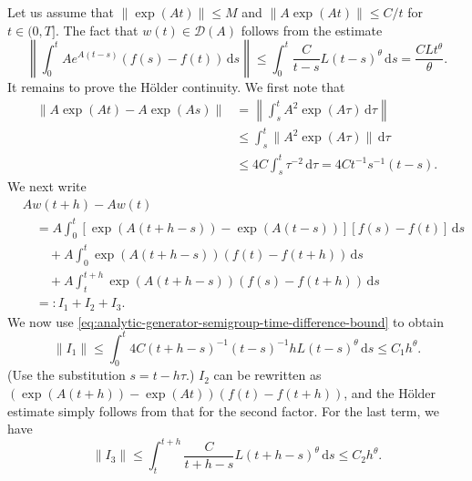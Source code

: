 \begin{Proof}
Let us assume that $\|\exp(At)\|\leq M$ and $\|A\exp(At)\|\leq C/t$ for $t\in(0,T]$. The fact that $w(t)\in\mathcal{D}(A)$ follows from the estimate
\begin{equation}\label{eq:analytic-holder-data-difference-in-generator-domain-bound}
\left\|\int_0^t Ae^{A(t-s)}(f(s)-f(t))\,\mathrm{d}s\right\|\leq\int_0^t\dfrac{C}{t-s}L(t-s)^\theta\,\mathrm{d}s=\dfrac{CLt^\theta}{\theta}.
\end{equation}
It remains to prove the Hölder continuity. We first note that
\begin{equation}\label{eq:analytic-generator-semigroup-time-difference-bound}
\begin{aligned}\|A\exp(At)-A\exp(As)\|&=\left\|\int_s^t A^2\exp(A\tau)\,\mathrm{d}\tau\right\|\\&\leq\int_s^t\|A^2\exp(A\tau)\|\,\mathrm{d}\tau\\&\leq4C\int_s^t\tau^{-2}\,\mathrm{d}\tau=4Ct^{-1}s^{-1}(t-s).\end{aligned}
\end{equation}
We next write\[\begin{aligned}
&Aw(t+h)-Aw(t)\\
&\quad=A\int_0^t[\exp(A(t+h-s))-\exp(A(t-s))][f(s)-f(t)]\,\mathrm{d}s\\
&\qquad+A\int_0^t\exp(A(t+h-s))(f(t)-f(t+h))\,\mathrm{d}s\\
&\qquad+A\int_t^{t+h}\exp(A(t+h-s))(f(s)-f(t+h))\,\mathrm{d}s\\
&\quad=:I_1+I_2+I_3.
\end{aligned}\]We now use \eqref{eq:analytic-generator-semigroup-time-difference-bound} to obtain
\begin{equation}\label{eq:analytic-holder-difference-convolution-first-term-bound}
\|I_1\|\leq\int_0^t4C(t+h-s)^{-1}(t-s)^{-1}hL(t-s)^\theta\,\mathrm{d}s\leq C_1h^\theta.
\end{equation}
(Use the substitution $s=t-h\tau$.) $I_2$ can be rewritten as $(\exp(A(t+h))-\exp(At))(f(t)-f(t+h))$, and the Hölder estimate simply follows from that for the second factor. For the last term, we have
\begin{equation}\label{eq:analytic-holder-difference-convolution-third-term-bound}
\|I_3\|\leq\int_t^{t+h}\dfrac{C}{t+h-s}L(t+h-s)^\theta\,\mathrm{d}s\leq C_2h^\theta.
\end{equation}

\end{Proof}

